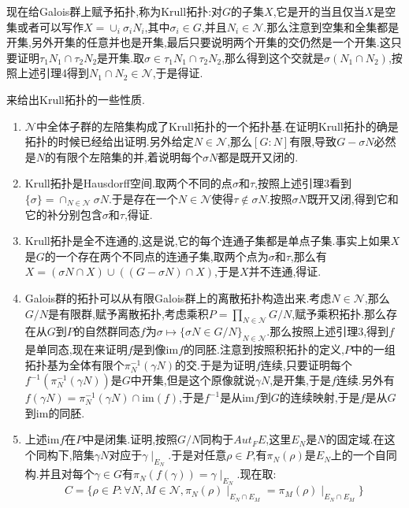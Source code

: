 现在给Galois群上赋予拓扑,称为Krull拓扑:对$G$的子集$X$,它是开的当且仅当$X$是空集或者可以写作$X=\cup_i\sigma_iN_i$,其中$\sigma_i\in G$,并且$N_i\in\mathscr{N}$.那么注意到空集和全集都是开集,另外开集的任意并也是开集,最后只要说明两个开集的交仍然是一个开集.这只要证明$\tau_1N_1\cap\tau_2 N_2$是开集.取$\sigma\in\tau_1N_1\cap\tau_2N_2$,那么得到这个交就是$\sigma(N_1\cap N_2)$,按照上述引理4得到$N_1\cap N_2\in\mathscr{N}$,于是得证.

来给出Krull拓扑的一些性质.
\begin{enumerate}
	\item $\mathscr{N}$中全体子群的左陪集构成了Krull拓扑的一个拓扑基.在证明Krull拓扑的确是拓扑的时候已经给出证明.另外给定$N\in\mathscr{N}$,那么$[G:N]$有限,导致$G-\sigma N$必然是$N$的有限个左陪集的并,着说明每个$\sigma N$都是既开又闭的.
	\item Krull拓扑是Hausdorff空间.取两个不同的点$\sigma$和$\tau$,按照上述引理3看到$\{\sigma\}=\cap_{N\in\mathscr{N}}\sigma N$.于是存在一个$N\in\mathscr{N}$使得$\tau\not\in\sigma N$.按照$\sigma N$既开又闭,得到它和它的补分别包含$\sigma$和$\tau$,得证.
	\item Krull拓扑是全不连通的,这是说,它的每个连通子集都是单点子集.事实上如果$X$是$G$的一个存在两个不同点的连通子集,取两个点为$\sigma$和$\tau$,那么有$X=(\sigma N\cap X)\cup((G-\sigma N)\cap X)$,于是$X$并不连通,得证.
	\item Galois群的拓扑可以从有限Galois群上的离散拓扑构造出来.考虑$N\in\mathscr{N}$,那么$G/N$是有限群,赋予离散拓扑,考虑乘积$P=\prod_{N\in\mathscr{N}}G/N$,赋予乘积拓扑.那么存在从$G$到$P$的自然群同态$f$为$\sigma\mapsto\{\sigma N\in G/N\}_{N\in\mathscr{N}}$.那么按照上述引理3,得到$f$是单同态,现在来证明$f$是到像$\mathrm{im}f$的同胚.注意到按照积拓扑的定义,$P$中的一组拓扑基为全体有限个$\pi_N^{-1}(\gamma N)$的交.于是为证明$f$连续,只要证明每个$f^{-1}(\pi_N^{-1}(\gamma N))$是$G$中开集,但是这个原像就说$\gamma N$,是开集,于是$f$连续.另外有$f(\gamma N)=\pi_N^{-1}(\gamma N)\cap\mathrm{im}(f)$,于是$f^{-1}$是从$\mathrm{im}f$到$G$的连续映射,于是$f$是从$G$到$\mathrm{im}$的同胚.
	\item 上述$\mathrm{im}f$在$P$中是闭集.证明,按照$G/N$同构于$Aut_FE$,这里$E_N$是$N$的固定域.在这个同构下,陪集$\gamma N$对应于$\gamma\mid_{E_N}$.于是对任意$\rho\in P$,有$\pi_N(\rho)$是$E_N$上的一个自同构.并且对每个$\gamma\in G$有$\pi_N(f(\gamma))=\gamma\mid_{E_N}$.现在取:
	$$C=\{\rho\in P:\forall N,M\in\mathscr{N},\pi_N(\rho)\mid_{E_N\cap E_M}=\pi_M(\rho)\mid_{E_N\cap E_M}\}$$
	

\end{enumerate}
